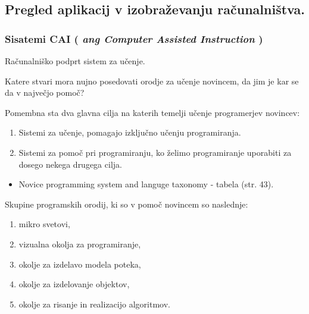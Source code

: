 
\subsection{Pregled aplikacij v izobraževanju računalništva.}
\label{pregled-aplikavij-v-izobraux17eevanju-raux10dunalniux161tva.}



\subsubsection{\texorpdfstring{Sisatemi CAI ( \emph{ang Computer
      Assisted Instruction} )}{Sisatemi CAI ( ang Computer Assisted
    Instruction )}}
\label{sisatemi-cai-ang-computer-assisted-instruction}

Računalniško podprt sistem za učenje.


Katere stvari mora nujno posedovati orodje za učenje novincem, da jim je
kar se da v največjo pomoč?

Pomembna sta dva glavna cilja na katerih temelji učenje programerjev
novincev:

\begin{enumerate}
\def\labelenumi{\arabic{enumi}.}
\item
  Sistemi za učenje, pomagajo izključno učenju programiranja.
\item
  Sistemi za pomoč pri programiranju, ko želimo programiranje uporabiti
  za dosego nekega drugega cilja.
\end{enumerate}

\begin{itemize}
\item
  Novice programming system and languge taxonomy - tabela (str. 43).
\end{itemize}

Skupine programskih orodij, ki so v pomoč novincem so naslednje:

\begin{enumerate}
\def\labelenumi{\arabic{enumi}.}
\item
  mikro svetovi,
\item
  vizualna okolja za programiranje,
\item
  okolje za izdelavo modela poteka,
\item
  okolje za izdelovanje objektov,
\item
  okolje za risanje in realizacijo algoritmov.
\end{enumerate}

